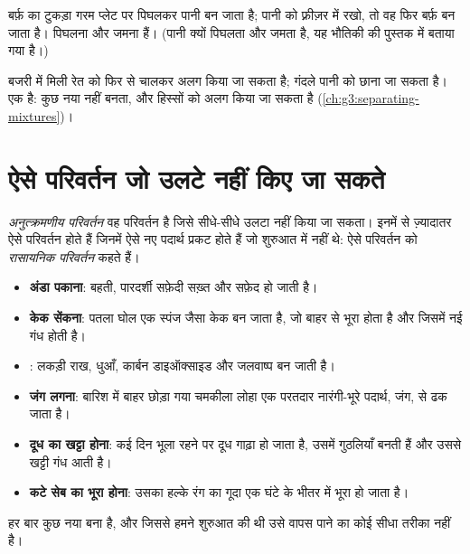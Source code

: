 \begin{example}[बर्फ़ और पानी]\label{ex:g5:irreversible-changes:ice}
बर्फ़ का टुकड़ा गरम प्लेट पर पिघलकर पानी बन जाता है; पानी को फ़्रीज़र में
रखो, तो वह फिर बर्फ़ बन जाता है। पिघलना और जमना  हैं। (पानी क्यों पिघलता और जमता है, यह भौतिकी की पुस्तक में बताया गया है।)
\end{example}

\begin{example}[मिलाना]\label{ex:g5:irreversible-changes:mix}
बजरी में मिली रेत को फिर से चालकर अलग किया जा सकता है; गंदले पानी को
छाना जा सकता है।  एक  है: कुछ नया नहीं बनता, और
हिस्सों को अलग किया जा सकता है (\cref{ch:g3:separating-mixtures})।
\end{example}

\section{ऐसे परिवर्तन जो उलटे नहीं किए जा सकते}

\begin{definition}[अनुत्क्रमणीय परिवर्तन और रासायनिक परिवर्तन]\label{def:g5:irreversible-changes:chemical-change}
\emph{अनुत्क्रमणीय परिवर्तन} वह परिवर्तन है
जिसे सीधे-सीधे उलटा नहीं किया जा सकता। इनमें से ज़्यादातर ऐसे परिवर्तन होते
हैं जिनमें ऐसे नए पदार्थ प्रकट होते हैं जो शुरुआत में नहीं थे: ऐसे परिवर्तन
को \emph{रासायनिक परिवर्तन} कहते हैं।
\end{definition}

\begin{example}[छह रासायनिक परिवर्तन]\label{ex:g5:irreversible-changes:six}
\begin{itemize}
  \item \textbf{अंडा पकाना}: बहती, पारदर्शी सफ़ेदी सख़्त और सफ़ेद हो
        जाती है।
  \item \textbf{केक सेंकना}: पतला घोल एक स्पंज जैसा केक बन जाता है,
        जो बाहर से भूरा होता है और जिसमें नई गंध होती है।
  \item \textbf{}: लकड़ी राख, धुआँ, कार्बन डाइऑक्साइड और
        जलवाष्प बन जाती है।
  \item \textbf{जंग लगना}: बारिश में बाहर छोड़ा गया चमकीला लोहा एक
        परतदार नारंगी-भूरे पदार्थ, जंग, से ढक जाता है।
  \item \textbf{दूध का खट्टा होना}: कई दिन भूला रहने पर दूध गाढ़ा हो
        जाता है, उसमें गुठलियाँ बनती हैं और उससे खट्टी गंध आती है।
  \item \textbf{कटे सेब का भूरा होना}: उसका हल्के रंग का गूदा एक घंटे के
        भीतर  में भूरा हो जाता है।
\end{itemize}
हर बार कुछ नया बना है, और जिससे हमने शुरुआत की थी उसे वापस पाने का
कोई सीधा तरीका नहीं है।
\end{example}

